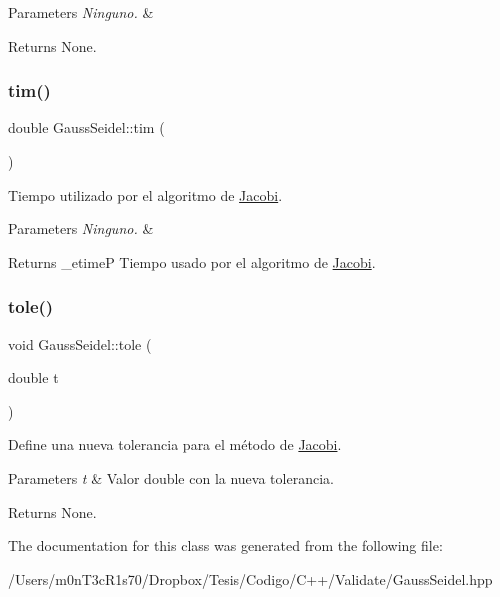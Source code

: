 \begin{DoxyParams}{Parameters}
{\em Ninguno.} & \\
\hline
\end{DoxyParams}
\begin{DoxyReturn}{Returns}
None. 
\end{DoxyReturn}
\hypertarget{class_gauss_seidel_a78d7823a16dd20eb30452ef340320a72}{}\label{class_gauss_seidel_a78d7823a16dd20eb30452ef340320a72} 
\subsubsection{\texorpdfstring{tim()}{tim()}}
{\footnotesize\ttfamily double Gauss\+Seidel\+::tim (\begin{DoxyParamCaption}{ }\end{DoxyParamCaption})\hspace{0.3cm}{\ttfamily [inline]}}



Tiempo utilizado por el algoritmo de \hyperlink{class_jacobi}{Jacobi}. 


\begin{DoxyParams}{Parameters}
{\em Ninguno.} & \\
\hline
\end{DoxyParams}
\begin{DoxyReturn}{Returns}
\+\_\+etimeP Tiempo usado por el algoritmo de \hyperlink{class_jacobi}{Jacobi}. 
\end{DoxyReturn}
\hypertarget{class_gauss_seidel_a6df722abff1a051a0659a42224ff28c3}{}\label{class_gauss_seidel_a6df722abff1a051a0659a42224ff28c3} 
\subsubsection{\texorpdfstring{tole()}{tole()}}
{\footnotesize\ttfamily void Gauss\+Seidel\+::tole (\begin{DoxyParamCaption}\item[{double}]{t }\end{DoxyParamCaption})\hspace{0.3cm}{\ttfamily [inline]}}



Define una nueva tolerancia para el método de \hyperlink{class_jacobi}{Jacobi}. 


\begin{DoxyParams}{Parameters}
{\em t} & Valor double con la nueva tolerancia. \\
\hline
\end{DoxyParams}
\begin{DoxyReturn}{Returns}
None. 
\end{DoxyReturn}


The documentation for this class was generated from the following file\+:\begin{DoxyCompactItemize}
\item 
/\+Users/m0n\+T3c\+R1s70/\+Dropbox/\+Tesis/\+Codigo/\+C++/\+Validate/Gauss\+Seidel.\+hpp\end{DoxyCompactItemize}
